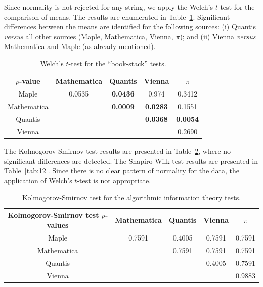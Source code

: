 \documentclass[10pt]{article}%
\begin{document}
Since normality is not rejected for any string, we apply the Welch's $t$-test
for the comparison of means. The results are enumerated in Table~\ref{tab:10}.
Significant differences between the means are identified for the following sources:
(i) Quantis {\it versus} all other sources (Maple, Mathematica, Vienna, $\pi$); and
(ii)
Vienna {\it versus} Mathematica and Maple (as already mentioned).



\begin{table}
\caption{Welch's $t$-test for the ``book-stack'' tests.}\label{tab:10}
\begin{center}
\begin{tabular}
[c]{ c c c c c }\hline\hline
$p$-value & Mathematica & Quantis & Vienna & $\pi$\\\hline
Maple  & 0.0535 & \bf{0.0436} & 0.974 & 0.3412\\
Mathematica &  & \bf{0.0009} & \bf{0.0283} & 0.1551\\
Quantis  &  &  & \bf{0.0368} & \bf{0.0054}\\
Vienna &  &  &  & 0.2690\\\hline\hline
\end{tabular}
\end{center}
\end{table}





The Kolmogorov-Smirnov test results are presented in Table~\ref{tab:11},
where no significant differences are detected.
The Shapiro-Wilk test results are presented in Table~\ref{tab:12}.
Since there is no clear
pattern of normality for the data, the application of Welch's $t$-test is not
appropriate.


\begin{table}
\caption{Kolmogorov-Smirnov test for the algorithmic information theory tests.}\label{tab:11}
 \begin{center}
 \begin{tabular}
[c]{ c c c c c }
\hline\hline
Kolmogorov-Smirnov test $p$-values & Mathematica & Quantis & Vienna & $\pi$ \\\hline
Maple  & 0.7591 & 0.4005 & 0.7591 & 0.7591\\
Mathematica &  & 0.7591 & 0.7591 & 0.7591\\
Quantis &  &  & 0.4005 & 0.7591\\
Vienna &  &  &  & 0.9883\\\hline\hline
\end{tabular}
\end{center}
\end{table}
\end{document}
